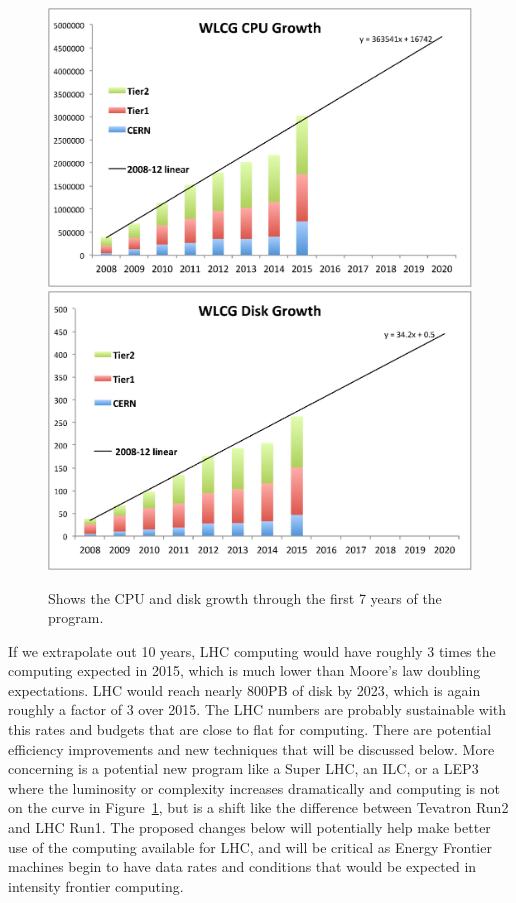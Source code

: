 \begin{figure}[htb]
\begin{center}
\includegraphics[width=0.45\hsize]{CpF-E2/Growth1.eps}
\includegraphics[width=0.45\hsize]{CpF-E2/Growth2.eps}
\caption{Shows the CPU and disk growth through the first 7 years of the program.}
\label{fig:growth}
\end{center}
\end{figure}



If we extrapolate out 10 years, LHC computing would have roughly 3 times the computing expected in 2015, 
which is much lower than Moore's law doubling expectations.    LHC would reach nearly 800PB of disk by 2023, 
which is again roughly a factor of 3 over 2015.    The LHC numbers are probably sustainable with this rates 
and budgets that are close to flat for computing.   There are potential efficiency improvements and new 
techniques that will be discussed below.    More concerning is a potential new program like a Super LHC, an ILC, or a 
LEP3 where the luminosity or complexity increases dramatically and computing is not on the curve in Figure~\ref{fig:growth},
 but is a shift like the difference between Tevatron Run2 and LHC Run1.    The proposed changes below will 
potentially help make better use of the computing available for LHC, and will be critical as Energy 
Frontier machines begin to have data rates and conditions that would be expected in intensity frontier computing.


